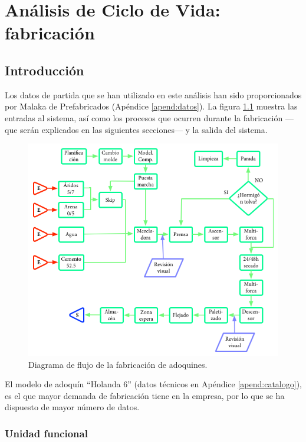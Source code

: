 \chapter{Análisis de Ciclo de Vida: fabricación}

\section{Introducción}\label{sec:obtenciondedatos}
Los datos de partida que se han utilizado en este análisis han sido proporcionados por Malaka de Prefabricados (Apéndice \ref{apend:datos}). La figura \ref{fig:diagrama_de_flujo} muestra las entradas al sistema, así como los procesos que ocurren durante la fabricación —que serán explicados en las siguientes secciones— y la salida del sistema.

\begin{figure}[!htb]
\centering
\includegraphics[width=15cm]{diagrama.png}
\caption{Diagrama de flujo de la fabricación de adoquines.}
\label{fig:diagrama_de_flujo}
\end{figure}

El modelo de adoquín ``Holanda 6'' (datos técnicos en Apéndice \ref{apend:catalogo}), es el que mayor demanda de fabricación tiene en la empresa, por lo que se ha dispuesto de mayor número de datos.

\subsection{Unidad funcional}

